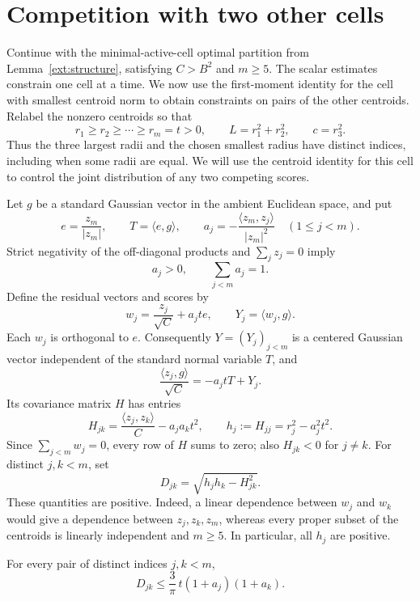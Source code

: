 \section{Competition with two other cells}
\label{geo:section}

Continue with the minimal-active-cell optimal partition from
Lemma~\ref{ext:structure}, satisfying $C>B^2$ and $m\ge5$.
The scalar estimates constrain one cell at a time. We now use the
first-moment identity for the cell with smallest centroid norm to obtain
constraints on pairs of the other centroids.
Relabel the nonzero centroids so that
\[
 r_1\ge r_2\ge\cdots\ge r_m=t>0,
 \qquad
 L=r_1^2+r_2^2,
 \qquad c=r_3^2.
\]
Thus the three largest radii and the chosen smallest radius have distinct
indices, including when some radii are equal.  We will use the centroid
identity for this cell to control the joint distribution of any
two competing scores.

Let $g$ be a standard Gaussian vector in the ambient Euclidean space, and
put
\[
 e=\frac{z_m}{|z_m|},\qquad T=\langle e,g\rangle,
 \qquad
 a_j=-\frac{\langle z_m,z_j\rangle}{|z_m|^2}
 \quad(1\le j<m).
\]
Strict negativity of the off-diagonal products and $\sum_jz_j=0$ imply
\begin{equation}
 a_j>0,\qquad \sum_{j<m}a_j=1.
 \label{geo:coefficients}
\end{equation}
Define the residual vectors and scores by
\[
 w_j=\frac{z_j}{\sqrt C}+a_jte,
 \qquad Y_j=\langle w_j,g\rangle.
\]
Each $w_j$ is orthogonal to $e$.  Consequently $Y=(Y_j)_{j<m}$ is a
centered Gaussian vector independent of the standard normal variable
$T$, and
\begin{equation}
 \frac{\langle z_j,g\rangle}{\sqrt C}=-a_jtT+Y_j.
 \label{geo:decomposition}
\end{equation}
Its covariance matrix $H$ has entries
\begin{equation}
 H_{jk}=\frac{\langle z_j,z_k\rangle}{C}-a_ja_kt^2,
 \qquad h_j:=H_{jj}=r_j^2-a_j^2t^2.
 \label{geo:covariance}
\end{equation}
Since $\sum_{j<m}w_j=0$, every row of $H$ sums to zero; also $H_{jk}<0$
for $j\ne k$.  For distinct $j,k<m$, set
\[
 D_{jk}=\sqrt{h_jh_k-H_{jk}^2}.
\]
These quantities are positive.  Indeed, a linear dependence between
$w_j$ and $w_k$ would give a dependence between $z_j,z_k,z_m$, whereas
every proper subset of the centroids is linearly independent and
$m\ge5$.  In particular, all $h_j$ are positive.

\begin{lemma}
\label{geo:pair}
For every pair of distinct indices $j,k<m$,
\begin{equation}
 D_{jk}\le \frac3\pi\,t(1+a_j)(1+a_k).
 \label{geo:pair-bound}
\end{equation}
\end{lemma}

